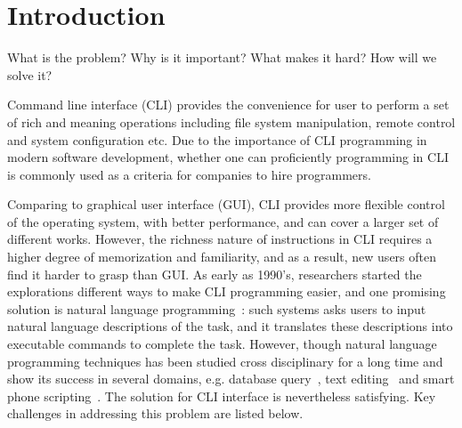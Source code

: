 \section{Introduction}

What is the problem?
Why is it important?
What makes it hard?
How will we solve it?

Command line interface (CLI) provides the convenience for user to perform a set of rich and meaning operations including file system manipulation, remote control and system configuration etc. Due to the importance of CLI programming in modern software development, whether one can proficiently programming in CLI is commonly used as a criteria for companies to hire programmers. 

Comparing to graphical user interface (GUI), CLI provides more flexible control of the operating system, with better performance, and can cover a larger set of different works. However, the richness nature of instructions in CLI requires a higher degree of memorization and familiarity, and as a result, new users often find it harder to grasp than GUI. As early as 1990's, researchers started the explorations different ways to make CLI programming easier, and one promising solution is natural language programming~\cite{Pederson-Report,Manaris:1994:DNL:198125.198137,ZOLTANFORD1991527}: such systems asks users to input natural language descriptions of the task, and it translates these descriptions into executable commands to complete the task. However, though natural language programming techniques has been studied cross disciplinary for a long time and show its success in several domains, e.g. database query~\cite{DBLP:journals/pvldb/LiJ14, DBLP:conf/sigmod/GulwaniM14}, text editing~\cite{DBLP:journals/corr/DesaiGHJKMRR15} and smart phone scripting~\cite{DBLP:conf/mobisys/LeGS13}. The solution for CLI interface is nevertheless satisfying. Key challenges in addressing this problem are listed below.
